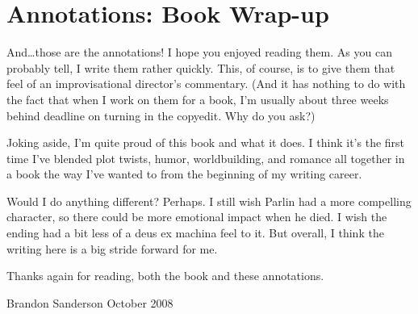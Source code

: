\section*{Annotations: Book Wrap-up}

And\ldots those are the annotations! I hope you enjoyed reading them. As you can probably tell, I write them rather quickly. This, of course, is to give them that feel of an improvisational director's commentary. (And it has nothing to do with the fact that when I work on them for a book, I'm usually about three weeks behind deadline on turning in the copyedit. Why do you ask?)

Joking aside, I'm quite proud of this book and what it does. I think it's the first time I've blended plot twists, humor, worldbuilding, and romance all together in a book the way I've wanted to from the beginning of my writing career.

Would I do anything different? Perhaps. I still wish Parlin had a more compelling character, so there could be more emotional impact when he died. I wish the ending had a bit less of a deus ex machina feel to it. But overall, I think the writing here is a big stride forward for me.

Thanks again for reading, both the book and these annotations.

\hfill Brandon Sanderson October 2008
